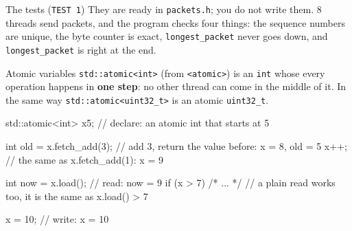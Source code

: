 \begin{note}{The tests (\texttt{TEST 1})}
They are ready in \texttt{packets.h}; you do not write them. 8 threads send packets, and the program checks four
things: the sequence numbers are unique, the byte counter is exact, \texttt{longest\_packet} never goes down, and
\texttt{longest\_packet} is right at the end.
\end{note}

\begin{note}{Atomic variables}
\texttt{std::atomic<int>} (from \texttt{<atomic>}) is an \texttt{int} whose every operation happens in
\textbf{one step}: no other thread can come in the middle of it. In the same way \texttt{std::atomic<uint32\_t>}
is an atomic \texttt{uint32\_t}.
\begin{code}
std::atomic<int> x{5};       // declare: an atomic int that starts at 5

int old = x.fetch_add(3);    // add 3, return the value before: x = 8, old = 5
x++;                         // the same as x.fetch_add(1): x = 9

int now = x.load();          // read: now = 9
if (x > 7) { /* ... */ }     // a plain read works too, it is the same as x.load() > 7

x = 10;                      // write: x = 10
\end{code}
\end{note}
